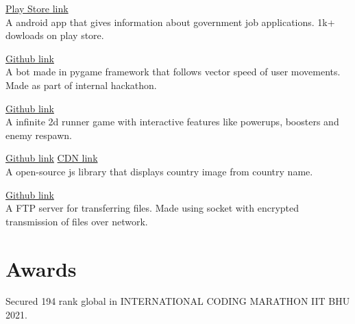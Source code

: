 \documentclass[]{deedy-resume-openfont}
\begin{document}
\begin{minipage}[t]{0.66\textwidth}
\hfill \href{https://play.google.com/store/apps/details?id=com.amostrone.akash.sanjeevwebsolutions}{Play Store link}\\
A android app that gives information about government job applications. 1k+ dowloads on play store.\\
\sectionsep

\hfill \href{https://github.com/jaiakash/spiddysense2021\_Akash}{Github link}\\
A bot made in pygame framework that follows vector speed of user movements. Made as part of internal hackathon.\\
\sectionsep
  

\hfill \href{https://github.com/jaiakash/NinjaVsSal}{Github link}\\
A infinite 2d runner game with interactive features like powerups, boosters and enemy respawn.\\
\sectionsep
  

\hfill \href{https://github.com/jaiakash/countryFlag}{Github link} \href{https://cdn.jsdelivr.net/gh/jaiakash/countryFlag@master/countryFlag.js}{CDN link}\\
A open-source js library that displays country image from country name. \\
\sectionsep
  

\hfill \href{https://github.com/jaiakash/alphaq-file-server}{Github link}\\
A FTP server for transferring files. Made using socket with encrypted transmission of files over network.\\
\sectionsep

%
%
\section{Awards}
 
Secured 194 rank global in INTERNATIONAL CODING MARATHON IIT BHU 2021.\\
 

 

 

 

\sectionsep
\end{minipage} 
\ 
\end{document}
